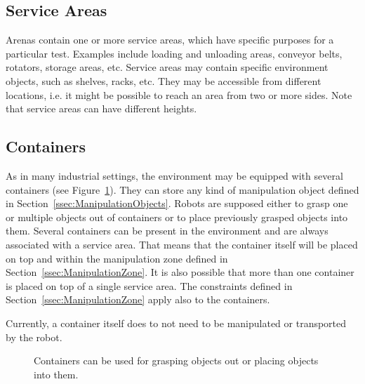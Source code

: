 \subsection{Service Areas}
Arenas contain one or more service areas, which have specific purposes for a particular test. Examples include loading and unloading areas, conveyor belts, rotators, storage areas, etc. Service areas may contain specific environment objects, such as shelves, racks, etc. They may be accessible from different locations, i.e. it might be possible to reach an area from two or more sides. Note that service areas can have different heights.

\subsection{Containers}
As in many industrial settings, the \RCAW environment may be equipped with several containers (see Figure~\ref{fig:containers}). They can store any kind of manipulation object defined in Section~\ref{ssec:ManipulationObjects}. Robots are supposed either to grasp one or multiple objects out of containers or to place previously grasped objects into them. Several containers can be present in the environment and are always associated with a service area. That means that the container itself will be placed on top and within the manipulation zone defined in Section~\ref{ssec:ManipulationZone}. 
It is also possible that more than one container is placed on top of a single service area.
The constraints defined in Section~\ref{ssec:ManipulationZone} apply also to the containers.

Currently, a container itself does to not need to be manipulated or transported by the robot.

\begin{figure} [h!]
\begin{center}
 \hspace{1cm}
\end{center}
\caption{Containers can be used for grasping objects out or placing objects into them.}
\label{fig:containers}
\end{figure}

